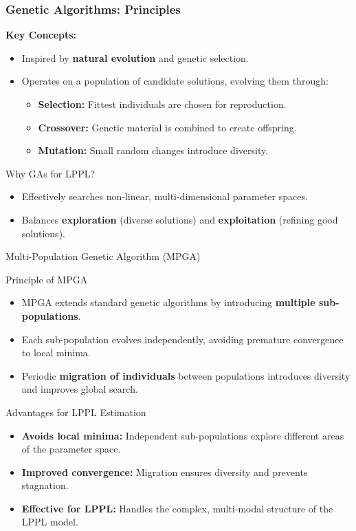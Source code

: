 \documentclass{beamer}
\begin{document}
\begin{frame}
    \frametitle{Genetic Algorithms: Principles}
    \textbf{Key Concepts:}
        \begin{itemize}
            \item Inspired by \textbf{natural evolution} and genetic selection.
            \item Operates on a population of candidate solutions, evolving them through:
            \begin{itemize}
                \item \textbf{Selection:} Fittest individuals are chosen for reproduction.
                \item \textbf{Crossover:} Genetic material is combined to create offspring.
                \item \textbf{Mutation:} Small random changes introduce diversity.
            \end{itemize}
        \end{itemize}
    \begin{block}{Why GAs for LPPL?}
        \begin{itemize}
            \item Effectively searches non-linear, multi-dimensional parameter spaces.
            \item Balances \textbf{exploration} (diverse solutions) and \textbf{exploitation} (refining good solutions).
        \end{itemize}
    \end{block}
\end{frame}

\begin{frame}{Multi-Population Genetic Algorithm (MPGA)}
    \begin{block}{Principle of MPGA}
        \begin{itemize}
            \item MPGA extends standard genetic algorithms by introducing \textbf{multiple sub-populations}.
            \item Each sub-population evolves independently, avoiding premature convergence to local minima.
            \item Periodic \textbf{migration of individuals} between populations introduces diversity and improves global search.
        \end{itemize}
    \end{block}
    \begin{block}{Advantages for LPPL Estimation}
        \begin{itemize}
            \item \textbf{Avoids local minima:} Independent sub-populations explore different areas of the parameter space.
            \item \textbf{Improved convergence:} Migration ensures diversity and prevents stagnation.
            \item \textbf{Effective for LPPL:} Handles the complex, multi-modal structure of the LPPL model.
        \end{itemize}
    \end{block}
\end{frame}
\end{document}
